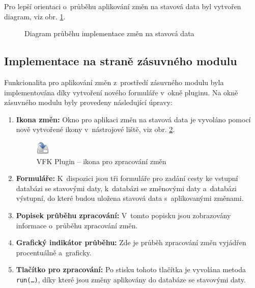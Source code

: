 \documentclass[a4paper,12pt,oneside]{book}
\begin{document}
Pro lepší orientaci o~průběhu aplikování změn na stavová data byl
vytvořen diagram, viz obr. \ref{l_zmeny_diagram}.

\begin{figure}
  \centering
  
  \caption{Diagram průběhu implementace změn na stavová data}
  \label{l_zmeny_diagram}
\end{figure}


\newpage
\subsection{Implementace na straně zásuvného modulu}
\label{l_implementace_zmen}
Funkcionalita pro aplikování změn z~prostředí zásuvného modulu byla
implementována díky vytvoření nového formuláře v~okně pluginu. Na okně
zásuvného modulu byly provedeny následující úpravy:

\begin{enumerate}
\item \textbf{Ikona změn:} Okno pro aplikaci změn na stavová data je
  vyvoláno pomocí nově vytvořené ikony v~nástrojové liště, viz
  obr. \ref{l_ikona_zmen}.

\begin{figure}[htb]
\centering
\includegraphics[scale=0.9]{images/applyChanges.png}
\caption[VFK Plugin -- ikona pro zpracování změn]{VFK Plugin -- ikona pro zpracování změn}
\label{l_ikona_zmen}
\end{figure} 
 
\item \textbf{Formuláře:} K~dispozici jsou tři formuláře pro zadání
  cesty ke vstupní databázi se stavovými daty, k~databázi se změnovými
  daty a~databázi výstupní, do které budou uložena stavová data
  s~aplikovanými změnami.
 
\item \textbf{Popisek průběhu zpracování:} V~tomto popisku jsou
  zobrazovány informace o~průběhu zpracování změn.
 
\item \textbf{Grafický indikátor průběhu:} Zde je průběh zpracování
  změn vyjádřen procentuálně a~graficky.
 
\item \textbf{Tlačítko pro zpracování:} Po stisku tohoto tlačítka
  je vyvolána metoda \texttt{run(\dots)}, díky které jsou změny
  aplikovány do databáze se stavovými daty.
 
\end{enumerate}
\end{document}

